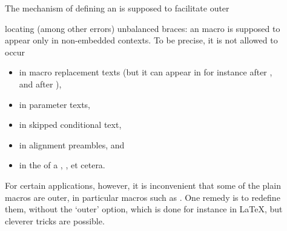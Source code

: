 \begin{description}
\item []
The mechanism of defining an  is supposed to facilitate
\cstoidx outer\par
locating (among other errors) unbalanced braces: an 
macro is supposed
to  appear only in non-embedded contexts.
To be precise, it is not allowed to occur 
\begin{itemize}
\item in macro replacement texts (but it can appear in
    for instance  after 
    , and after ),
\item in parameter texts,
\item in skipped conditional text,
\item in alignment preambles, and
\item in the  of a , ,
et cetera. \end{itemize}
For certain applications, however, it is inconvenient
that some of the plain macros  are outer, 
in particular macros such as . One remedy is to
redefine them, without the `outer' option, which
is done for instance in \LaTeX, but  cleverer tricks are possible.



\end{description}
